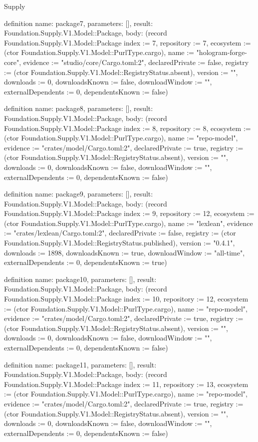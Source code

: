 \begin{lexlean}{Supply}
\begin{semanticmodule}
definition{
  name: package7,
  parameters: [],
  result: Foundation.Supply.V1.Model::Package,
  body: (record Foundation.Supply.V1.Model::Package {index := 7, repository := 7, ecosystem := (ctor Foundation.Supply.V1.Model::PurlType.cargo), name := "hologram-forge-core", evidence := "studio/core/Cargo.toml:2", declaredPrivate := false, registry := (ctor Foundation.Supply.V1.Model::RegistryStatus.absent), version := "", downloads := 0, downloadsKnown := false, downloadWindow := "", externalDependents := 0, dependentsKnown := false})
}

definition{
  name: package8,
  parameters: [],
  result: Foundation.Supply.V1.Model::Package,
  body: (record Foundation.Supply.V1.Model::Package {index := 8, repository := 8, ecosystem := (ctor Foundation.Supply.V1.Model::PurlType.cargo), name := "repo-model", evidence := "crates/model/Cargo.toml:2", declaredPrivate := true, registry := (ctor Foundation.Supply.V1.Model::RegistryStatus.absent), version := "", downloads := 0, downloadsKnown := false, downloadWindow := "", externalDependents := 0, dependentsKnown := false})
}

definition{
  name: package9,
  parameters: [],
  result: Foundation.Supply.V1.Model::Package,
  body: (record Foundation.Supply.V1.Model::Package {index := 9, repository := 12, ecosystem := (ctor Foundation.Supply.V1.Model::PurlType.cargo), name := "lexlean", evidence := "crates/lexlean/Cargo.toml:2", declaredPrivate := false, registry := (ctor Foundation.Supply.V1.Model::RegistryStatus.published), version := "0.4.1", downloads := 1898, downloadsKnown := true, downloadWindow := "all-time", externalDependents := 0, dependentsKnown := true})
}

definition{
  name: package10,
  parameters: [],
  result: Foundation.Supply.V1.Model::Package,
  body: (record Foundation.Supply.V1.Model::Package {index := 10, repository := 12, ecosystem := (ctor Foundation.Supply.V1.Model::PurlType.cargo), name := "repo-model", evidence := "crates/model/Cargo.toml:2", declaredPrivate := true, registry := (ctor Foundation.Supply.V1.Model::RegistryStatus.absent), version := "", downloads := 0, downloadsKnown := false, downloadWindow := "", externalDependents := 0, dependentsKnown := false})
}

definition{
  name: package11,
  parameters: [],
  result: Foundation.Supply.V1.Model::Package,
  body: (record Foundation.Supply.V1.Model::Package {index := 11, repository := 13, ecosystem := (ctor Foundation.Supply.V1.Model::PurlType.cargo), name := "repo-model", evidence := "crates/model/Cargo.toml:2", declaredPrivate := true, registry := (ctor Foundation.Supply.V1.Model::RegistryStatus.absent), version := "", downloads := 0, downloadsKnown := false, downloadWindow := "", externalDependents := 0, dependentsKnown := false})
}


\end{semanticmodule}
\end{lexlean}
